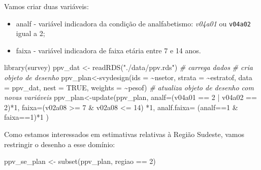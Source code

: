 \documentclass[
  12pt,
  brazilian,
]{book}
\newenvironment{Shaded}{\begin{snugshade}}{\end{snugshade}}
\newcommand{\AttributeTok}[1]{\textcolor[rgb]{0.77,0.63,0.00}{#1}}
\newcommand{\CommentTok}[1]{\textcolor[rgb]{0.56,0.35,0.01}{\textit{#1}}}
\newcommand{\ConstantTok}[1]{\textcolor[rgb]{0.00,0.00,0.00}{#1}}
\newcommand{\DecValTok}[1]{\textcolor[rgb]{0.00,0.00,0.81}{#1}}
\newcommand{\FunctionTok}[1]{\textcolor[rgb]{0.00,0.00,0.00}{#1}}
\newcommand{\NormalTok}[1]{#1}
\newcommand{\OtherTok}[1]{\textcolor[rgb]{0.56,0.35,0.01}{#1}}
\newcommand{\SpecialCharTok}[1]{\textcolor[rgb]{0.00,0.00,0.00}{#1}}
\newcommand{\StringTok}[1]{\textcolor[rgb]{0.31,0.60,0.02}{#1}}
\providecommand{\tightlist}{%
  \setlength{\itemsep}{0pt}\setlength{\parskip}{0pt}}
\theoremstyle{definition}
\theoremstyle{definition}
\theoremstyle{definition}
\theoremstyle{definition}
\theoremstyle{remark}
\begin{document}
Vamos criar duas variáveis:

\begin{itemize}
\tightlist
\item
  analf - variável indicadora da condição de analfabetismo: \emph{v04a01} ou
  \texttt{v04a02} igual a 2;
\item
  faixa - variável indicadora de faixa etária entre 7 e 14 anos.
\end{itemize}

\begin{Shaded}
\begin{Highlighting}[]
\FunctionTok{library}\NormalTok{(survey)}
\NormalTok{ppv\_dat }\OtherTok{\textless{}{-}} \FunctionTok{readRDS}\NormalTok{(}\StringTok{"./data/ppv.rds"}\NormalTok{) }\CommentTok{\# carrega dados}
\CommentTok{\# cria objeto de desenho}
\NormalTok{ppv\_plan}\OtherTok{\textless{}{-}}\FunctionTok{svydesign}\NormalTok{(}\AttributeTok{ids =} \SpecialCharTok{\textasciitilde{}}\NormalTok{nsetor, }\AttributeTok{strata =} \SpecialCharTok{\textasciitilde{}}\NormalTok{estratof,}
\AttributeTok{data =}\NormalTok{ ppv\_dat, }\AttributeTok{nest =} \ConstantTok{TRUE}\NormalTok{, }\AttributeTok{weights =} \SpecialCharTok{\textasciitilde{}}\NormalTok{pesof)}
\CommentTok{\# atualiza objeto de desenho com novas variáveis}
\NormalTok{ppv\_plan}\OtherTok{\textless{}{-}}\FunctionTok{update}\NormalTok{(ppv\_plan,}
  \AttributeTok{analf=}\NormalTok{(v04a01 }\SpecialCharTok{==} \DecValTok{2} \SpecialCharTok{|}\NormalTok{ v04a02 }\SpecialCharTok{==} \DecValTok{2}\NormalTok{)}\SpecialCharTok{*}\DecValTok{1}\NormalTok{,}
  \AttributeTok{faixa=}\NormalTok{(v02a08 }\SpecialCharTok{\textgreater{}=} \DecValTok{7} \SpecialCharTok{\&}\NormalTok{ v02a08 }\SpecialCharTok{\textless{}=} \DecValTok{14}\NormalTok{) }\SpecialCharTok{*}\DecValTok{1}\NormalTok{,}
  \AttributeTok{analf.faixa=}\NormalTok{ (analf}\SpecialCharTok{==}\DecValTok{1} \SpecialCharTok{\&}\NormalTok{ faixa}\SpecialCharTok{==}\DecValTok{1}\NormalTok{)}\SpecialCharTok{*}\DecValTok{1}
\NormalTok{)}
\end{Highlighting}
\end{Shaded}

Como estamos interessados em estimativas relativas à Região Sudeste, vamos restringir o desenho a esse domínio:

\begin{Shaded}
\begin{Highlighting}[]
\NormalTok{ppv\_se\_plan }\OtherTok{\textless{}{-}} \FunctionTok{subset}\NormalTok{(ppv\_plan, regiao }\SpecialCharTok{==} \DecValTok{2}\NormalTok{)}
\end{Highlighting}
\end{Shaded}
\end{document}
